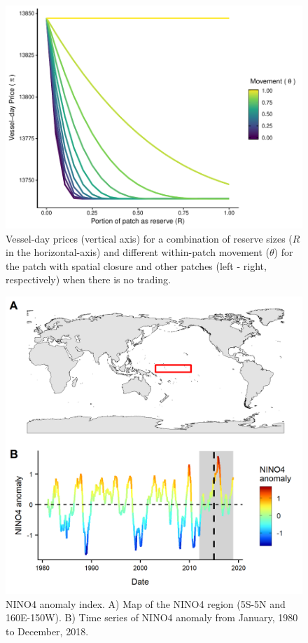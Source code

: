 \documentclass[12pt]{article}
\begin{document}
\begin{figure}
\centering
\includegraphics{img/vessel_day_price_with_trading_plot.pdf}
\caption{\label{fig:vessel_day_price_with_trading_plot}Vessel-day prices (vertical axis) for a combination of reserve sizes ($R$ in the horizontal-axis) and different within-patch movement ($\theta$) for the patch with spatial closure and other patches (left - right, respectively) when there is no trading.}
\end{figure}

\begin{figure}
\centering
\includegraphics{img/nino_plot.png}
\caption{\label{fig:nino_plot}NINO4 anomaly index. A) Map of the NINO4 region (5S-5N and 160E-150W). B) Time series of NINO4 anomaly from January, 1980 to December, 2018.}
\end{figure}
\end{document}
